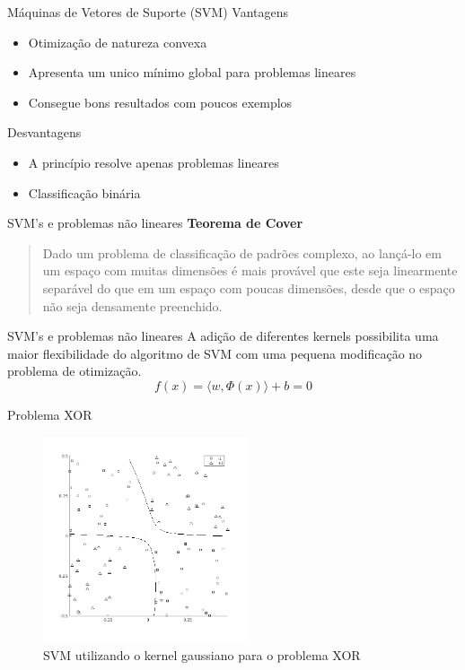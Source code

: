 \documentclass[10pt]{beamer}
\begin{document}
\begin{frame}{Máquinas de Vetores de Suporte (SVM)}
  Vantagens 
  \begin{itemize}
    \item Otimização de natureza convexa
    \item Apresenta um unico mínimo global para problemas lineares
    \item Consegue bons resultados com poucos exemplos
  \end{itemize}

  Desvantagens
  \begin{itemize}
    \item A princípio resolve apenas problemas lineares
    \item Classificação binária
  \end{itemize}
\end{frame}

\begin{frame}{SVM's e problemas não lineares}
    \textbf{Teorema de Cover}
    \begin{quote}
      Dado um problema de classificação de padrões complexo, ao lançá-lo em 
      um espaço com muitas dimensões é mais provável que este seja linearmente 
      separável do que em um espaço com poucas dimensões, desde que o espaço não seja densamente preenchido.
      \cite{haykin_neural_2010}
    \end{quote}
\end{frame}

\begin{frame} {SVM's e problemas não lineares}
  A adição de diferentes kernels possibilita uma maior flexibilidade do algoritmo de
  SVM com uma pequena modificação no problema de otimização.
  \begin{equation}
    f(x) = \langle w, \Phi(x) \rangle + b = 0
    \nonumber
  \end{equation}
\end{frame}

\begin{frame}{Problema XOR}
  \begin{figure}
    \centering
    \includegraphics[width=6cm]{images/svmXor.png}
    \caption{SVM utilizando o kernel gaussiano para o problema XOR}
  \end{figure}
\end{frame}
\end{document}
